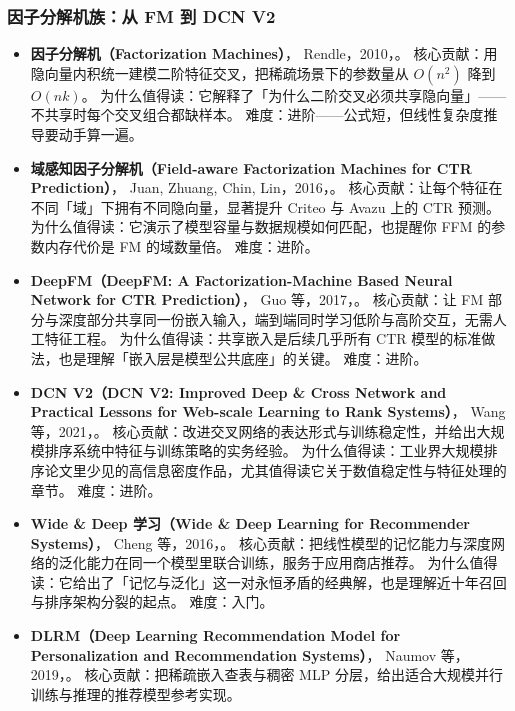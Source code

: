 \subsubsection{因子分解机族：从 FM 到 DCN V2}

\begin{itemize}
  \item \textbf{因子分解机（Factorization Machines）}，
        Rendle，2010，\cite{rendle2010fm}。
        核心贡献：用隐向量内积统一建模二阶特征交叉，把稀疏场景下的参数量从 $O(n^2)$ 降到 $O(nk)$。
        为什么值得读：它解释了「为什么二阶交叉必须共享隐向量」——不共享时每个交叉组合都缺样本。
        难度：进阶——公式短，但线性复杂度推导要动手算一遍。
  \item \textbf{域感知因子分解机（Field-aware Factorization Machines for CTR Prediction）}，
        Juan, Zhuang, Chin, Lin，2016，\cite{juan2017ffm}。
        核心贡献：让每个特征在不同「域」下拥有不同隐向量，显著提升 Criteo 与 Avazu 上的 CTR 预测。
        为什么值得读：它演示了模型容量与数据规模如何匹配，也提醒你 FFM 的参数内存代价是 FM 的域数量倍。
        难度：进阶。
  \item \textbf{DeepFM（DeepFM: A Factorization-Machine Based Neural Network for CTR Prediction）}，
        Guo 等，2017，\cite{guo2017deepfm}。
        核心贡献：让 FM 部分与深度部分共享同一份嵌入输入，端到端同时学习低阶与高阶交互，无需人工特征工程。
        为什么值得读：共享嵌入是后续几乎所有 CTR 模型的标准做法，也是理解「嵌入层是模型公共底座」的关键。
        难度：进阶。
  \item \textbf{DCN V2（DCN V2: Improved Deep \& Cross Network and Practical Lessons for Web-scale Learning to Rank Systems）}，
        Wang 等，2021，\cite{wang2021dcn}。
        核心贡献：改进交叉网络的表达形式与训练稳定性，并给出大规模排序系统中特征与训练策略的实务经验。
        为什么值得读：工业界大规模排序论文里少见的高信息密度作品，尤其值得读它关于数值稳定性与特征处理的章节。
        难度：进阶。
  \item \textbf{Wide \& Deep 学习（Wide \& Deep Learning for Recommender Systems）}，
        Cheng 等，2016，\cite{cheng2016widendeep}。
        核心贡献：把线性模型的记忆能力与深度网络的泛化能力在同一个模型里联合训练，服务于应用商店推荐。
        为什么值得读：它给出了「记忆与泛化」这一对永恒矛盾的经典解，也是理解近十年召回与排序架构分裂的起点。
        难度：入门。
  \item \textbf{DLRM（Deep Learning Recommendation Model for Personalization and Recommendation Systems）}，
        Naumov 等，2019，\cite{naumov2019dlrm}。
        核心贡献：把稀疏嵌入查表与稠密 MLP 分层，给出适合大规模并行训练与推理的推荐模型参考实现。

\end{itemize}
